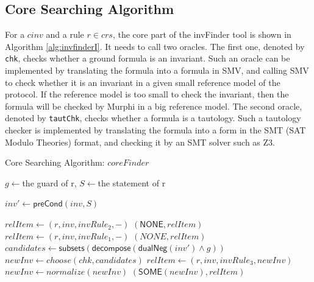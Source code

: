 \documentclass[final]{IEEEtran}
\def \andc {\wedge }
\begin{document}
{\subsection{Core Searching Algorithm}\label{sec:coresearchingAlgorithm}

For a  $cinv$ and a rule $r \in crs$, the core part of the {\sf invFinder} tool is shown in Algorithm \ref{alg:invfinderI}. It needs to call two oracles. The first one, denoted by {\tt chk}, checks whether a ground formula is an invariant. Such an oracle can be implemented by translating the formula into a formula in SMV, and calling SMV to check whether it is an invariant  in a given small reference model of the protocol. If  the reference model is too small to check the invariant, then the formula will be checked by Murphi in a big reference model.  The second oracle, denoted by {\tt tautChk}, checks whether a formula is a tautology. Such a tautology checker is implemented by translating the formula into a form in the SMT (SAT Modulo Theories) format, and checking it by an SMT solver such as Z3.

\begin{algorithm}

\caption{Core Searching Algorithm: $coreFinder$}\label{alg:invfinderI}



{
    $g\leftarrow $the guard of r, $S\leftarrow $the statement of r\;

    $inv'\leftarrow \mathsf{preCond}(inv, S)$\; \label{line:preCondComp}

    {
    $relItem\leftarrow (r, inv, invRule_2,-)$\;
    \Return $(\mathsf{NONE},  relItem )$\;
    }
    {
    $relItem\leftarrow (r, inv, invRule_1,-)$\;
    \Return $(NONE,  relItem )$\;
    }
    \Else
    {
    $candidates\leftarrow \mathsf{subsets}(\mathsf{decompose}(\mathsf{dualNeg}(inv')\andc g))$\;
    $newInv\leftarrow choose(chk,candidates)$\;
    $relItem\leftarrow (r, inv, invRule_3,newInv)$\;
    {
    $newInv \leftarrow  normalize(newInv)$\;%
    \Return $(\mathsf{SOME}(newInv),   relItem )$\;
    }
    }
}


\end{algorithm}}
\end{document}
